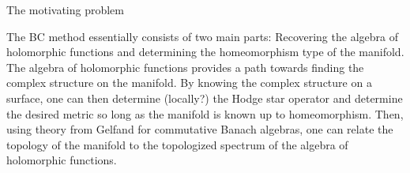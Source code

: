 The motivating problem 

The BC method essentially consists of two main parts: Recovering the algebra of holomorphic functions and determining the homeomorphism type of the manifold.  The algebra of holomorphic functions provides a path towards finding the complex structure on the manifold. By knowing the complex structure on a surface, one can then determine (locally?) the Hodge star operator and determine the desired metric so long as the manifold is known up to homeomorphism. Then, using theory from Gelfand for commutative Banach algebras, one can relate the topology of the manifold to the topologized spectrum of the algebra of holomorphic functions. 